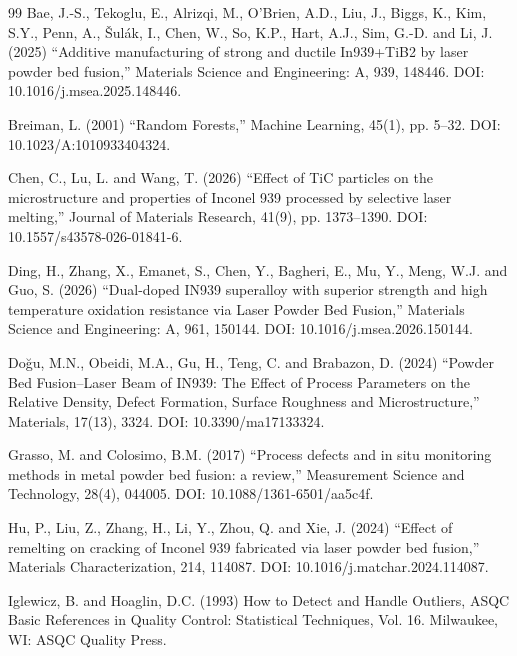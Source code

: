 \documentclass[a4paper]{article}
\newcommand{\sz}[1]{\fpeval{#1*\bodysize/14}}     %
\renewcommand{\small}{\fontsize{\sz{11.7}}{\sz{15.6}}\selectfont}
\begin{document}
\begin{thebibliography}{99}
\setlength{\itemsep}{4pt}\small
{}
Bae, J.-S., Tekoglu, E., Alrizqi, M., O'Brien, A.D., Liu, J., Biggs, K., Kim, S.Y., Penn, A., Šulák, I., Chen, W., So, K.P., Hart, A.J., Sim, G.-D. and Li, J. (2025) ``Additive manufacturing of strong and ductile In939+TiB2 by laser powder bed fusion,'' Materials Science and Engineering: A, 939, 148446. DOI: 10.1016/j.msea.2025.148446.

Breiman, L. (2001) ``Random Forests,'' Machine Learning, 45(1), pp. 5--32. DOI: 10.1023/A:1010933404324.

Chen, C., Lu, L. and Wang, T. (2026) ``Effect of TiC particles on the microstructure and properties of Inconel 939 processed by selective laser melting,'' Journal of Materials Research, 41(9), pp. 1373--1390. DOI: 10.1557/s43578-026-01841-6.

Ding, H., Zhang, X., Emanet, S., Chen, Y., Bagheri, E., Mu, Y., Meng, W.J. and Guo, S. (2026) ``Dual-doped IN939 superalloy with superior strength and high temperature oxidation resistance via Laser Powder Bed Fusion,'' Materials Science and Engineering: A, 961, 150144. DOI: 10.1016/j.msea.2026.150144.

Doğu, M.N., Obeidi, M.A., Gu, H., Teng, C. and Brabazon, D. (2024) ``Powder Bed Fusion--Laser Beam of IN939: The Effect of Process Parameters on the Relative Density, Defect Formation, Surface Roughness and Microstructure,'' Materials, 17(13), 3324. DOI: 10.3390/ma17133324.

Grasso, M. and Colosimo, B.M. (2017) ``Process defects and in situ monitoring methods in metal powder bed fusion: a review,'' Measurement Science and Technology, 28(4), 044005. DOI: 10.1088/1361-6501/aa5c4f.

Hu, P., Liu, Z., Zhang, H., Li, Y., Zhou, Q. and Xie, J. (2024) ``Effect of remelting on cracking of Inconel 939 fabricated via laser powder bed fusion,'' Materials Characterization, 214, 114087. DOI: 10.1016/j.matchar.2024.114087.

Iglewicz, B. and Hoaglin, D.C. (1993) How to Detect and Handle Outliers, ASQC Basic References in Quality Control: Statistical Techniques, Vol. 16. Milwaukee, WI: ASQC Quality Press.


\end{thebibliography}
\end{document}
